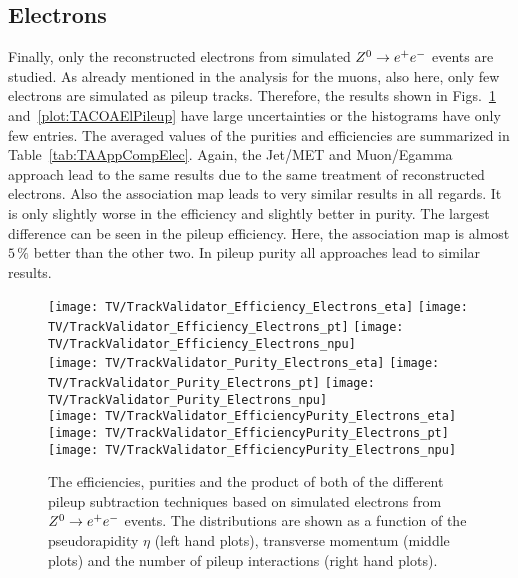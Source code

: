 

\clearpage
\subsection{Electrons \label{sec:TASEFRDAE} }

Finally, only the reconstructed electrons from simulated $\Zz\rightarrow\EE$ events are studied. As already mentioned in the analysis for the muons, also here, only few electrons are simulated as pileup tracks. Therefore, the results shown in Figs.~\ref{plot:TACOAElSignal} and~\ref{plot:TACOAElPileup} have large uncertainties or the histograms have only few entries. The averaged values of the purities and efficiencies are summarized in Table~\ref{tab:TAAppCompElec}. Again, the Jet/MET and Muon/Egamma approach lead to the same results due to the same treatment of reconstructed electrons. Also the association map leads to very similar results in all regards. It is only slightly worse in the efficiency and slightly better in purity. The largest difference can be seen in the pileup efficiency. Here, the association map is almost $5\,\%$ better than the other two. In pileup purity all approaches lead to similar results.

\begin{figure}[Ht]
    \centering
    \texttt{[image: TV/TrackValidator\_Efficiency\_Electrons\_eta]}
    \texttt{[image: TV/TrackValidator\_Efficiency\_Electrons\_pt]}
    \texttt{[image: TV/TrackValidator\_Efficiency\_Electrons\_npu]}
    \\
    \texttt{[image: TV/TrackValidator\_Purity\_Electrons\_eta]}
    \texttt{[image: TV/TrackValidator\_Purity\_Electrons\_pt]}
    \texttt{[image: TV/TrackValidator\_Purity\_Electrons\_npu]}
    \\
    \texttt{[image: TV/TrackValidator\_EfficiencyPurity\_Electrons\_eta]}
    \texttt{[image: TV/TrackValidator\_EfficiencyPurity\_Electrons\_pt]}
    \texttt{[image: TV/TrackValidator\_EfficiencyPurity\_Electrons\_npu]}
    \caption[Efficiencies, purities and their product of the different pileup subtraction techniques based on simulated electrons from $\Zz\rightarrow\EE$ events]{The efficiencies, purities and the product of both of the different pileup subtraction techniques based on simulated electrons from $\Zz\rightarrow\EE$ events. The distributions are shown as a function of the pseudorapidity $\eta$ (left hand plots), transverse momentum (middle plots) and the number of pileup interactions (right hand plots). \label{plot:TACOAElSignal}}
\end{figure}


